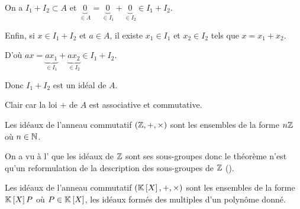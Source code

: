 \begin{dem}[1]
On a \(I_1+I_2\subset A\) et \(\underbrace{0}_{\in A}=\underbrace{0}_{\in I_1}+\underbrace{0}_{\in I_2}\in I_1+I_2\).

Enfin, si \(x\in I_1+I_2\) et \(a\in A\), il existe \(x_1\in I_1\) et \(x_2\in I_2\) tels que \(x=x_1+x_2\).

D'où \(ax=\underbrace{ax_1}_{\in I_1}+\underbrace{ax_2}_{\in I_2}\in I_1+I_2\).

Donc \(I_1+I_2\) est un idéal de \(A\).
\end{dem}

\begin{dem}[2 et 3]
Clair car la loi \(+\) de \(A\) est associative et commutative.
\end{dem}

\begin{theo}[Idéaux de \(\Z\)]
Les idéaux de l'anneau commutatif \(\anneau{\Z}\) sont les ensembles de la forme \(n\mathbb{Z}\) où \(n\in\mathbb{N}\).
\end{theo}

\begin{dem}
On a vu à l' que les idéaux de \(\Z\) sont ses sous-groupes donc le théorème n'est qu'un reformulation de la description des sous-groupes de \(\Z\) (\cf {}).
\end{dem}

\begin{theo}
Les idéaux de l'anneau commutatif \(\anneau{\poly}\) sont les ensembles de la forme \(\poly P\) où \(P\in\poly\), \cad les idéaux formés des multiples d'un polynôme donné.
\end{theo}

